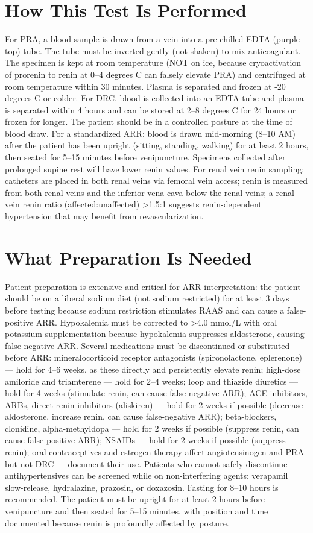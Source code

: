 \section*{How This Test Is Performed}
For PRA, a blood sample is drawn from a vein into a pre-chilled EDTA (purple-top) tube. The tube must be inverted gently (not shaken) to mix anticoagulant. The specimen is kept at room temperature (NOT on ice, because cryoactivation of prorenin to renin at 0--4 degrees C can falsely elevate PRA) and centrifuged at room temperature within 30 minutes. Plasma is separated and frozen at -20 degrees C or colder. For DRC, blood is collected into an EDTA tube and plasma is separated within 4 hours and can be stored at 2--8 degrees C for 24 hours or frozen for longer. The patient should be in a controlled posture at the time of blood draw. For a standardized ARR: blood is drawn mid-morning (8--10 AM) after the patient has been upright (sitting, standing, walking) for at least 2 hours, then seated for 5--15 minutes before venipuncture. Specimens collected after prolonged supine rest will have lower renin values. For renal vein renin sampling: catheters are placed in both renal veins via femoral vein access; renin is measured from both renal veins and the inferior vena cava below the renal veins; a renal vein renin ratio (affected:unaffected) >1.5:1 suggests renin-dependent hypertension that may benefit from revascularization.

\section*{What Preparation Is Needed}
Patient preparation is extensive and critical for ARR interpretation: the patient should be on a liberal sodium diet (not sodium restricted) for at least 3 days before testing because sodium restriction stimulates RAAS and can cause a false-positive ARR. Hypokalemia must be corrected to >4.0 mmol/L with oral potassium supplementation because hypokalemia suppresses aldosterone, causing false-negative ARR. Several medications must be discontinued or substituted before ARR: mineralocorticoid receptor antagonists (spironolactone, eplerenone) --- hold for 4--6 weeks, as these directly and persistently elevate renin; high-dose amiloride and triamterene --- hold for 2--4 weeks; loop and thiazide diuretics --- hold for 4 weeks (stimulate renin, can cause false-negative ARR); ACE inhibitors, ARBs, direct renin inhibitors (aliskiren) --- hold for 2 weeks if possible (decrease aldosterone, increase renin, can cause false-negative ARR); beta-blockers, clonidine, alpha-methyldopa --- hold for 2 weeks if possible (suppress renin, can cause false-positive ARR); NSAIDs --- hold for 2 weeks if possible (suppress renin); oral contraceptives and estrogen therapy affect angiotensinogen and PRA but not DRC --- document their use. Patients who cannot safely discontinue antihypertensives can be screened while on non-interfering agents: verapamil slow-release, hydralazine, prazosin, or doxazosin. Fasting for 8--10 hours is recommended. The patient must be upright for at least 2 hours before venipuncture and then seated for 5--15 minutes, with position and time documented because renin is profoundly affected by posture.


